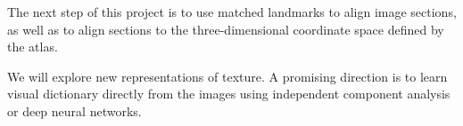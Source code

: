 \documentclass{llncs}
\begin{document}
The next step of this project is to use matched landmarks to align image sections, as well as to align sections to the three-dimensional coordinate space defined by the atlas.

We will explore new representations of texture. A promising direction is to learn visual dictionary directly from the images using independent component analysis or deep neural networks.





%
%




%
%
\end{document}

